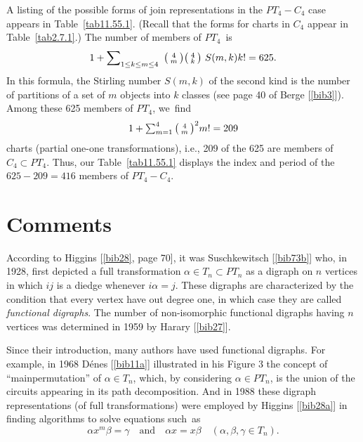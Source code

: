 \documentclass{surv-l}
\numberwithin{equation}{section}
\numberwithin{table}{section}
\numberwithin{figure}{section}
\theoremstyle{plain}
\theoremstyle{definition}
\begin{document}
A listing of the possible forms of join representations in the
$PT_{4}-C_{4}$ case appears in Table~\ref{tab11.55.1}. (Recall
that the forms for charts in $C_{4}$ appear in
Table~\ref{tab2.7.1}.) The number of members of $PT_{4}$~is
\[
1+\sum\nolimits_{1\leq k\leq m\leq 4}\ \big(\kern0.5pt\begin{smallmatrix}
4\\
m
\end{smallmatrix}\kern0.5pt\big)\big(\kern0.5pt\begin{smallmatrix}
4\\
k
\end{smallmatrix}\kern0.5pt\big)\ S(m, k)k!=625.
\]
In this formula, the Stirling number $S(m, k)$ of the second kind
is the number of partitions of a set of $m$ objects into $k$
classes (see page 40 of Berge [\ref{bib3}]).
Among these 625 members of $PT_{4}$, we~find
\[
1+\textstyle\sum_{m=1}^{4} \big(\kern0.5pt\begin{smallmatrix}
4\\
m
\end{smallmatrix}\kern0.5pt\big)^2 m!=209
\]
charts (partial one-one transformations), i.e., 209 of the 625 are
members of $C_{4}\subset PT_{4}$. Thus, our Table~\ref{tab11.55.1}
displays the index and period of the $625-209=416$ members of
$PT_{4}-C_{4}$.

\section{Comments}\label{sec11.56}

According to Higgins [\ref{bib28}, page 70], it was
Suschkewitsch
[\ref{bib73b}] who, in 1928, first depicted a
full transformation $\alpha\in T_{n}\subset PT_{n}$ as a digraph
on $n$ vertices in which $ij$ is a diedge whenever $i\alpha=j$.
These digraphs are characterized by the condition that every
vertex have out degree one, in which case they are called
\emph{functional digraphs}. The number of non-isomorphic
functional digraphs having $n$ vertices was determined in 1959 by
Harary [\ref{bib27}].

Since their introduction, many authors have used functional
digraphs. For example, in 1968 D\'{e}nes
[\ref{bib11a}] illustrated in his Figure 3 the
concept of ``mainpermutation'' of $\alpha\in T_{n}$, which, by
considering $\alpha\in PT_{n}$, is the union of the circuits
appearing in its path decomposition. And in 1988 these digraph
representations (of full transformations) were employed by Higgins
[\ref{bib28a}] in finding algorithms to solve
equations such~as
\[
\alpha x^{m}\beta=\gamma\quad \mathrm{and}\quad \alpha x=x\beta\quad
(\alpha,\beta, \gamma\in T_{n}).
\]
\end{document}
